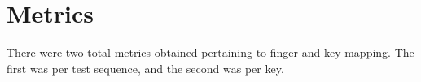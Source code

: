 \documentclass{report}
\begin{document}






\section{Metrics}
\label{section:metric}

There were two total metrics obtained pertaining to finger and key mapping. The
first was per test sequence, and the second was per key.
\end{document}
